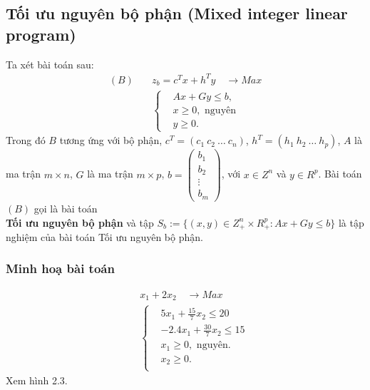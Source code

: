 \documentclass[12pt,a4paper]{report}
\begin{document}
\subsection*{Tối ưu nguyên bộ phận (Mixed integer linear program)}
Ta xét bài toán sau:
\begin{equation}\label{B}
\begin{split}
(B) \quad & z_b=c^Tx+h^Ty \quad \longrightarrow Max \\
          & \left\{\begin{split}
            &Ax+Gy \leq  b, \\
            &x \geq 0, \text{ nguyên} \\
            &y \geq 0.
            \end{split}\right.    
\end{split}
\end{equation}    
Trong đó $B$ tương ứng với bộ phận, $c^T=(c_1 \: c_2 \: \ldots \: c_n)$, $h^T=(h_1 \: h_2 \: \ldots \: h_p)$, $A$ là ma trận $m\times n$, $G$ là ma trận $m\times p$, $b=\begin{pmatrix}
    b_1 \\
    b_2 \\
    \vdots \\
    b_m
    \end{pmatrix}$, với $x\in Z^n$ và $y\in R^p$.
Bài toán $(B)$ gọi là bài toán \\ \textbf{Tối ưu nguyên bộ phận} và tập $S_b:=\{(x,y)\in Z^n_+\times R^p_+: Ax+Gy\leq b\}$ là tập nghiệm của bài toán Tối ưu nguyên bộ phận.

\subsubsection*{Minh hoạ bài toán}
   \begin{equation}
        \begin{split}
        \quad & x_1 + 2x_2 \quad \longrightarrow Max \\
                    & \left\{\begin{split}
                    & 5x_1 + \frac{15}{7}x_2 \leq 20 \\
                    & -2.4x_1 + \frac{30}{7}x_2 \leq 15 \\
                    &x_1 \geq 0, \text{ nguyên}. \\
                    &x_2 \geq 0. \\
                    \end{split}\right.    
        \end{split}
        \end{equation}            
Xem hình 2.3.
\end{document}

